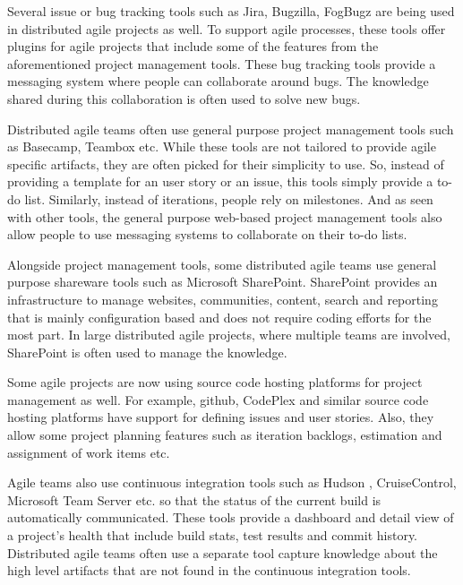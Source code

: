 Several issue or bug tracking tools such as Jira\cite{jira}, Bugzilla\cite{bugzilla}, FogBugz\cite{fog_bugz} are being used in distributed agile projects as well. To support agile processes, these tools offer plugins for agile projects that include some of the features from the aforementioned project management tools. These bug tracking tools provide a messaging system where people can collaborate around bugs. The knowledge shared during this collaboration is often used to solve new bugs\cite{issue_tracking}.

Distributed agile teams often use general purpose project management tools such as Basecamp\cite{basecamp}, Teambox\cite{team_box} etc. While these tools are not tailored to provide agile specific artifacts, they are often picked for their simplicity to use. So, instead of providing a template for an user story or an issue, this tools simply provide a to-do list. Similarly, instead of iterations, people rely on milestones. And as seen with other tools, the general purpose web-based project management tools also allow people to use messaging systems to collaborate on their to-do lists.

Alongside project management tools, some distributed agile teams use general purpose shareware tools such as Microsoft SharePoint\cite{share_point}. SharePoint provides an infrastructure to manage websites, communities, content, search and reporting that is mainly configuration based and does not require coding efforts for the most part. In large distributed agile projects, where multiple teams are involved, SharePoint is often used to manage the knowledge.

Some agile projects are now using source code hosting platforms for project management as well. For example, github\cite{github}, CodePlex\cite{codeplex} and similar source code hosting platforms have support for defining issues and user stories. Also, they allow some project planning features such as iteration backlogs, estimation and assignment of work items etc.

Agile teams also use continuous integration tools such as Hudson \cite{Hudson}, CruiseControl\cite{cruise_control}, Microsoft Team Server\cite{team_server} etc. so that the status of the current build is automatically communicated. These tools provide a dashboard and detail view of a project's health that include build stats, test results and commit history. Distributed agile teams often use a separate tool capture knowledge about the high level artifacts that are not found in the continuous integration tools.

